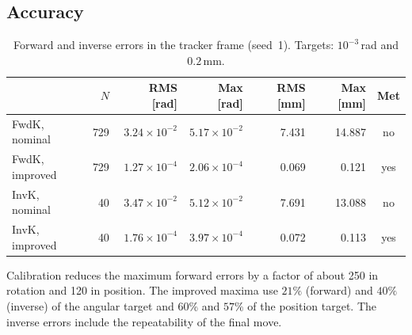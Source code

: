 \documentclass[../main.tex]{subfiles}
\begin{document}
\subsection{Accuracy}\label{sec:res-acc}
\begin{table}[H]
\centering\small
\caption{Forward and inverse errors in the tracker frame (seed~1). Targets: $10^{-3}$\,rad and $0.2$\,mm.}\label{tab:res-acc}
\begin{tabular}{@{}lrrrrrc@{}}
\toprule
 & $N$ & RMS [rad] & Max [rad] & RMS [mm] & Max [mm] & Met \\\midrule
FwdK, nominal & 729 & $3.24\times10^{-2}$ & $5.17\times10^{-2}$ & 7.431 & 14.887 & no \\
FwdK, improved & 729 & $1.27\times10^{-4}$ & $2.06\times10^{-4}$ & 0.069 & 0.121 & yes \\
InvK, nominal & 40 & $3.47\times10^{-2}$ & $5.12\times10^{-2}$ & 7.691 & 13.088 & no \\
InvK, improved & 40 & $1.76\times10^{-4}$ & $3.97\times10^{-4}$ & 0.072 & 0.113 & yes \\
\bottomrule
\end{tabular}
\end{table}
Calibration reduces the maximum forward errors by a factor of about 250 in rotation and 120 in position. The improved maxima use $21\%$ (forward) and $40\%$ (inverse) of the angular target and $60\%$ and $57\%$ of the position target. The inverse errors include the repeatability of the final move.
\end{document}
